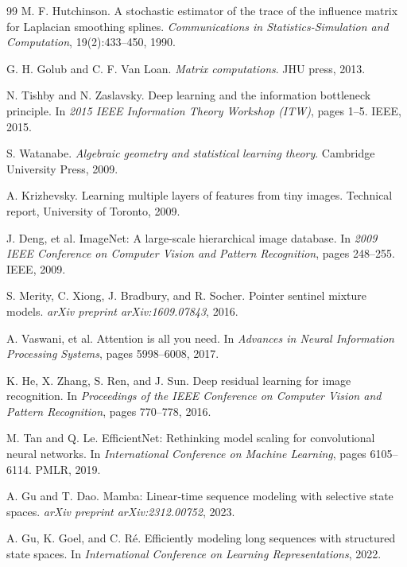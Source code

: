 \documentclass[11pt, a4paper]{article}
\theoremstyle{definition}
\begin{document}
\begin{thebibliography}{99}
M. F. Hutchinson.
\newblock A stochastic estimator of the trace of the influence matrix for Laplacian smoothing splines.
\newblock \emph{Communications in Statistics-Simulation and Computation}, 19(2):433--450, 1990.

G. H. Golub and C. F. Van Loan.
\newblock \emph{Matrix computations}.
\newblock JHU press, 2013.

N. Tishby and N. Zaslavsky. 
\newblock Deep learning and the information bottleneck principle.
\newblock In \emph{2015 IEEE Information Theory Workshop (ITW)}, pages 1--5. IEEE, 2015.

S. Watanabe. 
\newblock \emph{Algebraic geometry and statistical learning theory}.
\newblock Cambridge University Press, 2009.

A. Krizhevsky. 
\newblock Learning multiple layers of features from tiny images.
\newblock Technical report, University of Toronto, 2009.

J. Deng, et al.
\newblock ImageNet: A large-scale hierarchical image database. 
\newblock In \emph{2009 IEEE Conference on Computer Vision and Pattern Recognition}, pages 248--255. IEEE, 2009.

S. Merity, C. Xiong, J. Bradbury, and R. Socher. 
\newblock Pointer sentinel mixture models.
\newblock \emph{arXiv preprint arXiv:1609.07843}, 2016.

A. Vaswani, et al.
\newblock Attention is all you need. 
\newblock In \emph{Advances in Neural Information Processing Systems}, pages 5998--6008, 2017.

K. He, X. Zhang, S. Ren, and J. Sun.
\newblock Deep residual learning for image recognition. 
\newblock In \emph{Proceedings of the IEEE Conference on Computer Vision and Pattern Recognition}, pages 770--778, 2016.

M. Tan and Q. Le.
\newblock EfficientNet: Rethinking model scaling for convolutional neural networks. 
\newblock In \emph{International Conference on Machine Learning}, pages 6105--6114. PMLR, 2019.

A. Gu and T. Dao. 
\newblock Mamba: Linear‑time sequence modeling with selective state spaces.
\newblock \emph{arXiv preprint arXiv:2312.00752}, 2023.

A. Gu, K. Goel, and C. R\'e. 
\newblock Efficiently modeling long sequences with structured state spaces.
\newblock In \emph{International Conference on Learning Representations}, 2022.


\end{thebibliography}
\end{document}
